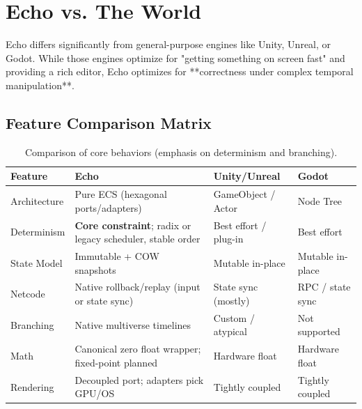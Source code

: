 \section{Echo vs. The World}

Echo differs significantly from general-purpose engines like Unity, Unreal, or Godot. While those engines optimize for "getting something on screen fast" and providing a rich editor, Echo optimizes for **correctness under complex temporal manipulation**.

\subsection{Feature Comparison Matrix}

\begin{table}[htbp]
    \centering
    \renewcommand{\arraystretch}{1.15}
    \begin{tabular}{@{}>{\raggedright\arraybackslash}p{3.0cm}
                    >{\raggedright\arraybackslash}p{3.4cm}
                    >{\raggedright\arraybackslash}p{3.4cm}
                    >{\raggedright\arraybackslash}p{3.0cm}@{}}
        \toprule
        \textbf{Feature} & \textbf{Echo} & \textbf{Unity/Unreal} & \textbf{Godot} \\ \midrule
        Architecture & Pure ECS (hexagonal ports/adapters) & GameObject / Actor & Node Tree \\
        Determinism & \textbf{Core constraint}; radix or legacy scheduler, stable order & Best effort / plug-in & Best effort \\
        State Model & Immutable + COW snapshots & Mutable in-place & Mutable in-place \\
        Netcode & Native rollback/replay (input or state sync) & State sync (mostly) & RPC / state sync \\
        Branching & Native multiverse timelines & Custom / atypical & Not supported \\
        Math & Canonical zero float wrapper; fixed-point planned & Hardware float & Hardware float \\
        Rendering & Decoupled port; adapters pick GPU/OS & Tightly coupled & Tightly coupled \\ \bottomrule
    \end{tabular}
    \caption{Comparison of core behaviors (emphasis on determinism and branching).}
    \label{tab:comparison}
\end{table}


